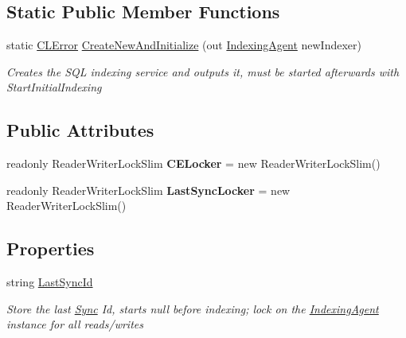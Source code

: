 \subsection*{Static Public Member Functions}
\begin{DoxyCompactItemize}
\item 
static \hyperlink{class_cloud_api_public_1_1_model_1_1_c_l_error}{C\-L\-Error} \hyperlink{class_cloud_api_public_1_1_s_q_l_indexer_1_1_indexing_agent_a0e956d0bbe633961139d440ea91acc24}{Create\-New\-And\-Initialize} (out \hyperlink{class_cloud_api_public_1_1_s_q_l_indexer_1_1_indexing_agent}{Indexing\-Agent} new\-Indexer)
\begin{DoxyCompactList}\small\item\em Creates the S\-Q\-L indexing service and outputs it, must be started afterwards with Start\-Initial\-Indexing \end{DoxyCompactList}\end{DoxyCompactItemize}
\subsection*{Public Attributes}
\begin{DoxyCompactItemize}
\item 
\hypertarget{class_cloud_api_public_1_1_s_q_l_indexer_1_1_indexing_agent_aa4deb010555c85b86efe40d27c6c1842}{readonly Reader\-Writer\-Lock\-Slim {\bfseries C\-E\-Locker} = new Reader\-Writer\-Lock\-Slim()}\label{class_cloud_api_public_1_1_s_q_l_indexer_1_1_indexing_agent_aa4deb010555c85b86efe40d27c6c1842}

\item 
\hypertarget{class_cloud_api_public_1_1_s_q_l_indexer_1_1_indexing_agent_a1bb708c5bf42f70b66aacd0ddcbf208f}{readonly Reader\-Writer\-Lock\-Slim {\bfseries Last\-Sync\-Locker} = new Reader\-Writer\-Lock\-Slim()}\label{class_cloud_api_public_1_1_s_q_l_indexer_1_1_indexing_agent_a1bb708c5bf42f70b66aacd0ddcbf208f}

\end{DoxyCompactItemize}
\subsection*{Properties}
\begin{DoxyCompactItemize}
\item 
string \hyperlink{class_cloud_api_public_1_1_s_q_l_indexer_1_1_indexing_agent_a9295f92ed5326ef6bda65d736574a82b}{Last\-Sync\-Id}
\begin{DoxyCompactList}\small\item\em Store the last \hyperlink{namespace_cloud_api_public_1_1_sync}{Sync} Id, starts null before indexing; lock on the \hyperlink{class_cloud_api_public_1_1_s_q_l_indexer_1_1_indexing_agent}{Indexing\-Agent} instance for all reads/writes \end{DoxyCompactList}\end{DoxyCompactItemize}


